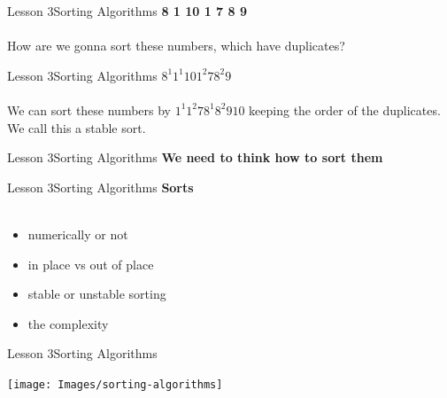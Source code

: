 \documentclass[aspectratio=1610]{beamer}
\begin{document}
\begin{frame}{Lesson 3}{Sorting Algorithms}
\LARGE
\textbf{8 1 10 1 7 8 9}\\~\\
How are we gonna sort these numbers, which have duplicates?
\end{frame}



\begin{frame}{Lesson 3}{Sorting Algorithms}
\LARGE
$ 8^1  1^1  10  1^2  7  8^2  9$\\~\\
We can sort these numbers by $1^1 1^2 7 8^1 8^2 9 10$ keeping the 
order of the duplicates. We call this a stable sort.
\end{frame}



\begin{frame}{Lesson 3}{Sorting Algorithms}
\huge
\textbf{We need to think how to sort them}
\end{frame}


\begin{frame}{Lesson 3}{Sorting Algorithms}
\LARGE
\textbf{Sorts}\\~\\
\Large
\begin{itemize}
	\item numerically or not
 	\item in place vs out of place 
	\item stable or unstable sorting
	\item the complexity
\end{itemize}

\end{frame}




\begin{frame}{Lesson 3}{Sorting Algorithms}
\begin{center}
\texttt{[image: Images/sorting-algorithms]}
\end{center}
\end{frame}


\end{document}
